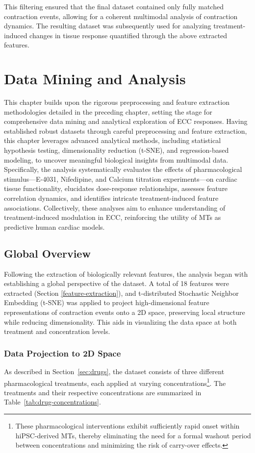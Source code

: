 \documentclass{report}
\begin{document}
        This filtering ensured that the final dataset contained only fully matched contraction events, allowing for a coherent multimodal analysis of contraction dynamics. The resulting dataset was subsequently used for analyzing treatment-induced changes in tissue response quantified through the above extracted features.
        
        

\chapter{Data Mining and Analysis}
\label{analysis}
This chapter builds upon the rigorous preprocessing and feature extraction methodologies detailed in the preceding chapter, setting the stage for comprehensive data mining and analytical exploration of ECC responses. Having established robust datasets through careful preprocessing and feature extraction, this chapter leverages advanced analytical methods, including statistical hypothesis testing, dimensionality reduction (t-SNE), and regression-based modeling, to uncover meaningful biological insights from multimodal data. Specifically, the analysis systematically evaluates the effects of pharmacological stimulus—E-4031, Nifedipine, and Calcium titration experiments—on cardiac tissue functionality, elucidates dose-response relationships, assesses feature correlation dynamics, and identifies intricate treatment-induced feature associations. Collectively, these analyses aim to enhance understanding of treatment-induced modulation in ECC, reinforcing the utility of MTs as predictive human cardiac models.

\section{Global Overview}
    \label{global-overview}
    Following the extraction of biologically relevant features, the analysis began with establishing a global perspective of the dataset. A total of 18 features were extracted (Section \ref{feature-extraction}), and t-distributed Stochastic Neighbor Embedding (t-SNE) \cite{tsne} was applied to project high-dimensional feature representations of contraction events onto a 2D space, preserving local structure while reducing dimensionality. This aids in visualizing the data space at both treatment and concentration levels.

    \subsection{Data Projection to 2D Space}
    \label{sec:global-perp}
        As described in Section~\ref{sec:drugs}, the dataset consists of three different pharmacological treatments, each applied at varying concentrations\footnote{These pharmacological interventions exhibit sufficiently rapid onset within hiPSC-derived MTs, thereby eliminating the need for a formal washout period between concentrations and minimizing the risk of carry-over effects.}. The treatments and their respective concentrations are summarized in Table~\ref{tab:drug-concentrations}.
\end{document}
